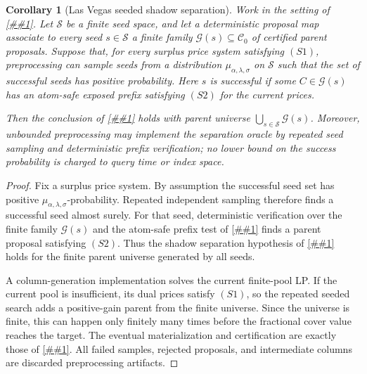\documentclass[10pt]{article}
\newcommand{\cref}[1]{\ref{##1}}
\newtheorem{corollary}[theorem]{Corollary}
\theoremstyle{definition}
\begin{document}
\begin{corollary}[Las Vegas seeded shadow separation]
   \label{cor:seeded-shadow-separation}
   Work in the setting of \cref{lem:shadow-price-density-compiler}.  Let
   $\mathcal S$ be a finite seed space, and let a deterministic proposal map
   associate to every seed $s\in\mathcal S$ a finite family
   $\mathcal G(s)\subseteq\mathcal C_0$ of certified parent proposals.  Suppose
   that, for every surplus price system satisfying \((S1)\), preprocessing can
   sample seeds from a distribution
   $\mu_{\alpha,\lambda,\sigma}$ on $\mathcal S$ such that the set of successful
   seeds has positive probability.  Here $s$ is successful if some
   $C\in\mathcal G(s)$ has an atom-safe exposed prefix satisfying \((S2)\) for
   the current prices.

   Then the conclusion of \cref{lem:shadow-price-density-compiler} holds with
   parent universe $\bigcup_{s\in\mathcal S}\mathcal G(s)$.  Moreover,
   unbounded preprocessing may implement the separation oracle by repeated
   seed sampling and deterministic prefix verification; no lower bound on the
   success probability is charged to query time or index space.
\end{corollary}

\begin{proof}
   Fix a surplus price system.  By assumption the successful seed set has
   positive $\mu_{\alpha,\lambda,\sigma}$-probability.  Repeated independent
   sampling therefore finds a successful seed almost surely.  For that seed,
   deterministic verification over the finite family $\mathcal G(s)$ and the
   atom-safe prefix test of \cref{lem:atom-safe-subchild} finds a parent
   proposal satisfying \((S2)\).  Thus the shadow separation hypothesis of
   \cref{lem:shadow-price-density-compiler} holds for the finite parent
   universe generated by all seeds.

   A column-generation implementation solves the current finite-pool LP.  If
   the current pool is insufficient, its dual prices satisfy \((S1)\), so the
   repeated seeded search adds a positive-gain parent from the finite universe.
   Since the universe is finite, this can happen only finitely many times before
   the fractional cover value reaches the target.  The eventual
   materialization and certification are exactly those of
   \cref{lem:shadow-price-density-compiler}.  All failed samples, rejected
   proposals, and intermediate columns are discarded preprocessing artifacts.
\end{proof}
\end{document}
